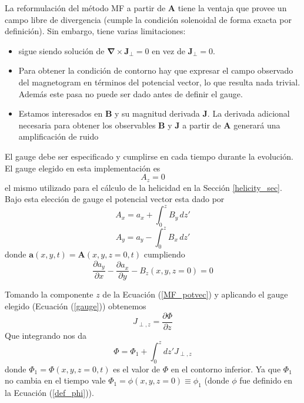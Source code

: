 \documentclass[a4paper,10pt]{article}
\def\bB{{\boldsymbol{B}}}
\def\ba{{\boldsymbol{a}}}
\def\bA{{\boldsymbol{A}}}
\def\bJ{{\boldsymbol{J}}}
\def\rot{\boldsymbol{\nabla \times}}
\def\dx#1{\frac{\partial #1}{\partial x}}
\def\dy#1{\frac{\partial #1}{\partial y}}
\def\dz#1{\frac{\partial #1}{\partial z}}
\def\eq#1{Ecuación (\ref{#1})}
\def\jperp{\bJ_\perp}
\begin{document}
La reformulación del método MF a partir de $\bA$ tiene la ventaja que provee un campo libre de divergencia (cumple la condición solenoidal de forma exacta por definición). Sin embargo, tiene varias limitaciones:
\begin{itemize}
\item sigue siendo solución de $\rot \jperp =0$ en vez de $\jperp=0$.
\item Para obtener la condición de contorno hay que expresar el campo observado del magnetogram en términos del potencial vector, lo que resulta nada trivial. Además este pasa no puede ser dado antes de definir el gauge.
\item Estamos interesados en $\bB$ y su magnitud derivada $\bJ$. La derivada adicional necesaria para obtener los observables $\bB$ y $\bJ$ a partir de $\bA$ generará una amplificación de ruido
\end{itemize}
El gauge debe ser especificado y cumplirse en cada tiempo durante la evolución. El gauge elegido en esta implementación es 
\begin{equation}
A_z=0 
\label{gauge}
\end{equation}
el mismo utilizado para el cálculo de la helicidad en la Sección \ref{helicity_sec}. Bajo esta elección de gauge el potencial vector esta dado por
\begin{equation}
 A_x = a_x + \int_0^z B_y \,dz'
 \label{Ax}
\end{equation}
\begin{equation}
 A_y = a_y - \int_0^z B_x \,dz'
 \label{Ay}
\end{equation}
donde $\ba(x,y,t)=\bA(x,y,z=0,t)$ cumpliendo
\begin{equation}
 \dx{a_y}-\dy{a_x}-B_z(x,y,z=0) =0
\end{equation}

Tomando la componente $z$  de la \eq{MF_potvec} y aplicando el gauge elegido (\eq{gauge}) obtenemos
\begin{equation}
 J_{\perp,z} = \dz{\Phi}
\end{equation}
Que integrando nos da
\begin{equation}
 \Phi = \Phi_1 + \int_0^z dz' J_{\perp,z}
  \label{Phi_integral}
\end{equation}
donde $\Phi_1=\Phi(x,y,z=0,t)$ es el valor de $\Phi$ en el contorno inferior. Ya que $\Phi_1$ no cambia en el tiempo vale $\Phi_1=\phi(x,y,z=0)\equiv \phi_1$ (donde $\phi$ fue definido en la \eq{def_phi}).
\end{document}
